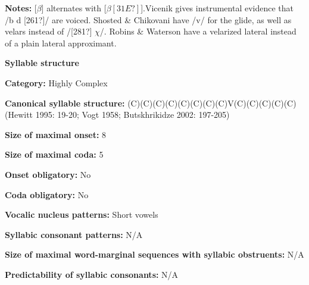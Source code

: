 \begin{styleBody}
\textbf{Notes:} [$\beta $] alternates with [$\beta [31E?]$].Vicenik gives instrumental evidence that /b d [261?]/ are voiced. Shosted \& Chikovani have /v/ for the glide, as well as velars instead of /[281?] $\chi $/. Robins \& Waterson have a velarized lateral instead of a plain lateral approximant.
\end{styleBody}

\begin{styleBody}
\textbf{Syllable structure}
\end{styleBody}

\begin{styleBody}
\textbf{Category:} Highly Complex
\end{styleBody}

\begin{styleBody}
\textbf{Canonical syllable structure: }(C)(C)(C)(C)(C)(C)(C)(C)V(C)(C)(C)(C)(C) (Hewitt 1995: 19-20; Vogt 1958; Butskhrikidze 2002: 197-205)
\end{styleBody}

\begin{styleBody}
\textbf{Size of maximal onset:} 8
\end{styleBody}

\begin{styleBody}
\textbf{Size of maximal coda:} 5
\end{styleBody}

\begin{styleBody}
\textbf{Onset obligatory:} No
\end{styleBody}

\begin{styleBody}
\textbf{Coda obligatory:} No
\end{styleBody}

\begin{styleBody}
\textbf{Vocalic nucleus patterns:} Short vowels
\end{styleBody}

\begin{styleBody}
\textbf{Syllabic consonant patterns:} N/A
\end{styleBody}

\begin{styleBody}
\textbf{Size of maximal word{}-marginal sequences with syllabic obstruents:} N/A
\end{styleBody}

\begin{styleBody}
\textbf{Predictability of syllabic consonants:} N/A
\end{styleBody}

